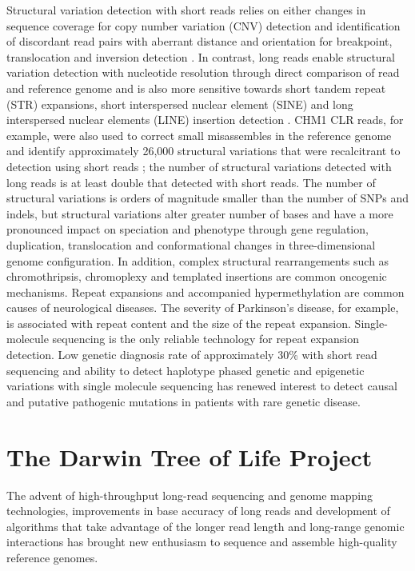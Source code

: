 Structural variation detection with short reads relies on either changes in sequence coverage for copy number variation (CNV) detection and identification of discordant read pairs with aberrant distance and orientation for breakpoint, translocation and inversion detection \cite{Alkan2011-dv}. In contrast, long reads enable structural variation detection with nucleotide resolution through direct comparison of read and reference genome and is also more sensitive towards short tandem repeat (STR) expansions, short interspersed nuclear element (SINE) and long interspersed nuclear elements (LINE) insertion detection \cite{Chaisson2015-zz}. CHM1 CLR reads, for example, were also used to correct small misassembles in the reference genome and identify approximately 26,000 structural variations that were recalcitrant to detection using short reads \cite{Chaisson2015-zz}; the number of structural variations detected with long reads is at least double that detected with short reads. The number of structural variations is orders of magnitude smaller than the number of SNPs and indels, but structural variations alter greater number of bases and have a more pronounced impact on speciation and phenotype through gene regulation, duplication, translocation\cite{Weischenfeldt2013-tl} and conformational changes in three-dimensional genome configuration\cite{Spielmann2018-fm,}. In addition, complex structural rearrangements such as chromothripsis\cite{Stephens2011-gj, Korbel2013-to}, chromoplexy\cite{Baca2013-po} and templated insertions\cite{Yu2010-jr} are common oncogenic mechanisms. Repeat expansions and accompanied hypermethylation are common causes of neurological diseases\cite{Zhou2022-ci}. The severity of Parkinson’s disease, for example, is associated with repeat content and the size of the repeat expansion\cite{}. Single-molecule sequencing is the only reliable technology for repeat expansion detection. Low genetic diagnosis rate of approximately 30\% with short read sequencing and ability to detect haplotype phased genetic and epigenetic variations with single molecule sequencing has renewed interest to detect causal and putative pathogenic mutations in patients with rare genetic disease\cite{}. 

\section{The Darwin Tree of Life Project}

The advent of high-throughput long-read sequencing\cite{} and genome mapping technologies\cite{}, improvements in base accuracy of long reads \cite{Wenger2019-pw} and development of algorithms that take advantage of the longer read length and long-range genomic interactions \cite{Dudchenko2017-kb} has brought new enthusiasm to sequence and assemble high-quality reference genomes\cite {}. 


